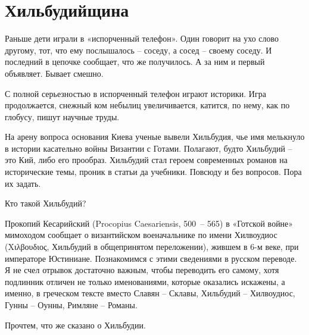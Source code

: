 \chapter{Хильбудийщина}

Раньше дети играли в «испорченный телефон». Один говорит на ухо слово другому, тот, что ему послышалось – соседу, а сосед – своему соседу. И последний в цепочке сообщает, что же получилось. А за ним и первый объявляет. Бывает смешно.

С полной серьезностью в испорченный телефон играют историки. Игра продолжается, снежный ком небылиц увеличивается, катится, по нему, как по глобусу, пишут научные труды.

На арену вопроса основания Киева ученые вывели Хильбудия, чье имя мелькнуло в истории касательно войны Византии с Готами. Полагают, будто Хильбудий – это Кий, либо его прообраз. Хильбудий стал героем современных романов на исторические темы, проник в статьи да учебники. Повсюду и без вопросов. Пора их задать.

Кто такой Хильбудий?

Прокопий Кесарийский (Procopius Caesariensis, 500\ – 565) в «Готской войне»\cite{procopius01}  мимоходом сообщает о византийском военачальнике по имени Хилвоудиос (Χιλβου\-διος, Хильбудий в общепринятом переложении), жившем в 6-м веке, при императоре Юстиниане. Познакомимся с этими сведениями в русском переводе\cite{procopius02}. Я не счел отрывок достаточно важным, чтобы переводить его самому, хотя подлинник отличен не только именованиями, которые оказались искажены, а именно, в греческом тексте вместо Славян – Склавы, Хильбудий – Хилвоудиос, Гунны – Оунны, Римляне – Романы.

Прочтем, что же сказано о Хильбудии.

